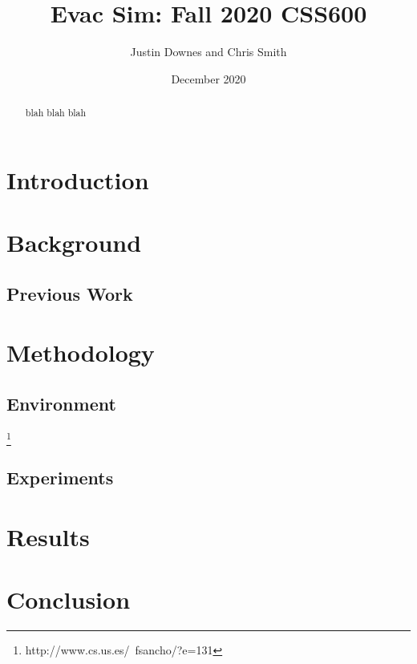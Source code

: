 \documentclass[12pt,letterpaper]{article}
\begin{document}
\title{Evac Sim: Fall 2020 CSS600 }

\author{Justin Downes and Chris Smith}
\date{December 2020}
\maketitle

\begin{abstract}
blah blah blah

\end{abstract}
\section {Introduction}



\section {Background}
\subsection{Previous Work}
\cite{almeidaCrowdSimulationModeling2013} 
\cite{kneidl}
\cite{kuligowskil}
\cite{zhouSimulationPedestrianEvacuation2019}

\section {Methodology}
\subsection{Environment}
\cite{mirahmadiNovelAlgorithmRealtime2012}
\footnote{http://www.cs.us.es/~fsancho/?e=131}
\subsection{Experiments}

\section{Results}



\section {Conclusion}



\end{document}
